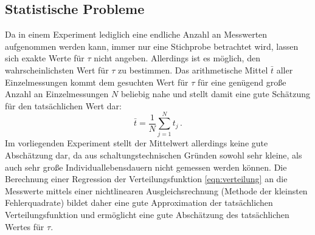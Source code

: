 \subsection{Statistische Probleme}
Da in einem Experiment lediglich eine endliche Anzahl an Messwerten aufgenommen werden kann, immer nur eine Stichprobe betrachtet wird, lassen sich exakte Werte für $\tau$ nicht angeben.
Allerdings ist es möglich, den wahrscheinlichsten Wert für $\tau$ zu bestimmen.
Das arithmetische Mittel $\bar{t}$ aller Einzelmessungen kommt dem gesuchten Wert für $\tau$
für eine genügend große Anzahl an Einzelmessungen $N$
beliebig nahe und stellt damit eine gute Schätzung für den tatsächlichen Wert dar:
\begin{equation}
  \bar{t}=\frac{1}{N}\sum_{j=1}^{N} t_j \mathrm{\,.}
\end{equation}
Im vorliegenden Experiment stellt der Mittelwert allerdings keine gute Abschätzung dar, da aus schaltungstechnischen Gründen sowohl sehr kleine, als auch sehr große Individuallebensdauern nicht gemessen werden können.
Die Berechnung einer Regression der Verteilungsfunktion \eqref{eqn:verteilung} an die Messwerte mittels einer nichtlinearen Ausgleichsrechnung (Methode der kleinsten Fehlerquadrate) bildet daher eine gute Approximation der tatsächlichen Verteilungsfunktion und ermöglicht eine gute Abschätzung des tatsächlichen Wertes für $\tau$.
